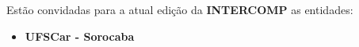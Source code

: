 
\begin{article}
	\label{art:convidadas}
	Estão convidadas para a atual edição da \textbf{INTERCOMP} as entidades:
	\begin{itemize}[noitemsep]
		\item \textbf{UFSCar - Sorocaba}
	\end{itemize}
\end{article}
